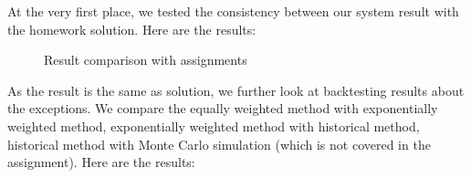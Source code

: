 \documentclass[letterpaper,11pt, oneside]{layout}
\begin{document}
At the very first place, we tested the consistency between our system result with the homework solution. Here are the results:

    \begin{figure}[!hbt]
    \center
    \caption{Result comparison with assignments}
    \label{fig:results:vg:loss}
    \end{figure}
    
    
As the result is the same as solution, we further look at backtesting results about the exceptions. We compare the equally weighted method with exponentially weighted method, exponentially weighted method with historical method,  historical method with Monte Carlo simulation (which is not covered in the assignment). Here are the results:
\end{document}
